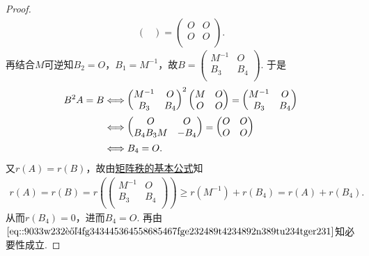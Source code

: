 \documentclass[../../main.tex]{subfiles}%
\begin{document}
\begin{proof}
\begin{align*}
\begin{pmatrix}
\end{pmatrix} = \begin{pmatrix}
O&		O\\
O&		O\\
\end{pmatrix}.
\end{align*}
再结合\(M\)可逆知\(B_2 = O\)，\(B_1 = M^{-1}\)，故\(B = \begin{pmatrix}
M^{-1}&		O\\
B_3&		B_4\\
\end{pmatrix}\). 于是
\begin{align}
B^2A = B &\Longleftrightarrow \begin{pmatrix}
M^{-1}&		O\\
B_3&		B_4\\
\end{pmatrix}^2 \begin{pmatrix}
M&		O\\
O&		O\\
\end{pmatrix} = \begin{pmatrix}
M^{-1}&		O\\
B_3&		B_4\\
\end{pmatrix} \notag \\
&\Longleftrightarrow \begin{pmatrix}
O&		O\\
B_4B_3M&		-B_4\\
\end{pmatrix} = \begin{pmatrix}
O&		O\\
O&		O\\
\end{pmatrix} \notag \\
&\Longleftrightarrow B_4 = O. \label{eq::9033w232让4fg343445364558685467fge232489t4234892n389tu234tger231}
\end{align}
又\(r(A) = r(B)\)，故由\hyperref[proposition:矩阵秩的基本公式]{矩阵秩的基本公式}知
\begin{align*}
r(A) = r(B) = r\left( \begin{pmatrix}
M^{-1}&		O\\
B_3&		B_4\\
\end{pmatrix} \right) \geqslant r(M^{-1}) + r(B_4) = r(A) + r(B_4).
\end{align*}
从而\(r(B_4) = 0\)，进而\(B_4 = O\). 再由\(\eqref{eq::9033w232让4fg343445364558685467fge232489t4234892n389tu234tger231}\)知必要性成立.


\end{proof}
\end{document}
